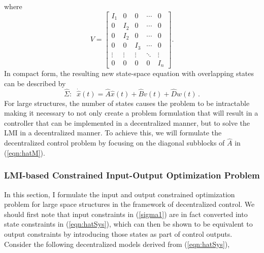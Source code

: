 \documentclass[11pt]{ucthesis}
\begin{document}
where
\begin{equation}
V = \begin{bmatrix}
I_{1}&0&0&\cdots&0\\
0&I_2&0&\cdots&0\\
0&I_2&0&\cdots&0\\
0&0&I_3&\cdots&0\\
\vdots&\vdots&\vdots&\ddots&\vdots\\
0&0&0&0&I_n
\end{bmatrix} .
\end{equation}
In compact form, the resulting new state-space equation with overlapping states can be described by
\begin{equation}
\hat{\Sigma} : \;\; \dot{\hat{x}}(t) = \hat{A}\hat{x}(t) + \hat{B}v(t) + \hat{D}w(t) \,.
\label{eqn:hatSys}
\end{equation}
For large structures, the number of states causes the problem to be intractable making it necessary to not only create a problem formulation that will result in a controller that can be implemented in a decentralized manner, but to solve the LMI in a decentralized manner. To achieve this, we will formulate the decentralized control problem by focusing on the diagonal subblocks of $\hat{A}$ in (\ref{eqn:hatM}).  

\subsubsection{LMI-based Constrained Input-Output Optimization Problem}
\label{sec:LMI}
In this section, I formulate the input and output constrained optimization problem for large space structures in the framework of decentralized control. We should first note that input constraints in (\ref{sigma1}) are in fact converted into state constraints in (\ref{eqn:hatSys}), which can then be shown to be equivalent to output constraints by introducing those states as part of control outputs. Consider the following decentralized models derived from (\ref{eqn:hatSys}),
\end{document}
